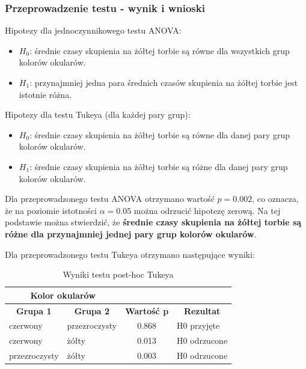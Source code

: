        \subsubsection{Przeprowadzenie testu - wynik i wnioski}
        Hipotezy dla jednoczynnikowego testu ANOVA:
        \begin{itemize}
            \item $H_0$: średnie czasy skupienia na żółtej torbie są równe dla wszystkich grup kolorów okularów.
            \item $H_1$: przynajmniej jedna para średnich czasów skupienia na żółtej torbie jest istotnie różna.
        \end{itemize}

        Hipotezy dla testu Tukeya (dla każdej pary grup):
        \begin{itemize}
            \item $H_0$: średnie czasy skupienia na żółtej torbie są równe dla danej pary grup kolorów okularów.
            \item $H_1$: średnie czasy skupienia na żółtej torbie są różne dla danej pary grup kolorów okularów.
        \end{itemize}

        Dla przeprowadzonego testu ANOVA otrzymano wartość $p=0.002$, co oznacza, że na poziomie istotności $\alpha=0.05$
        można odrzucić hipotezę zerową. Na tej podstawie można stwierdzić, że \textbf{średnie czasy skupienia na żółtej torbie są różne dla przynajmniej jednej pary grup kolorów okularów}.

        Dla przeprowadzonego testu Tukeya otrzymano następujące wyniki:
        \begin{table}[H]
            \centering
            \caption{Wyniki testu post-hoc Tukeya}
             \begin{tabular}{|ll|cl}
            \cline{1-2}
            \multicolumn{2}{|c|}{\textbf{Kolor   okularów}}                                         & \textbf{}                               & \multicolumn{1}{c}{\textbf{}}          \\ \hline
            \multicolumn{1}{|c|}{\textbf{Grupa 1}} & \multicolumn{1}{c|}{\textbf{Grupa 2}} & \multicolumn{1}{c|}{\textbf{Wartość p}} & \multicolumn{1}{c|}{\textbf{Rezultat}} \\ \hline
            \multicolumn{1}{|l|}{czerwony}         & przezroczysty                         & \multicolumn{1}{c|}{0.868}              & \multicolumn{1}{l|}{H0 przyjęte}       \\ \hline
            \multicolumn{1}{|l|}{czerwony}         & żółty                                 & \multicolumn{1}{c|}{0.013}              & \multicolumn{1}{l|}{H0 odrzucone}      \\ \hline
            \multicolumn{1}{|l|}{przezroczysty}    & żółty                                 & \multicolumn{1}{c|}{0.003}              & \multicolumn{1}{l|}{H0 odrzucone}      \\ \hline
            \end{tabular}
            \label{tab:Tukeya}
        \end{table}

